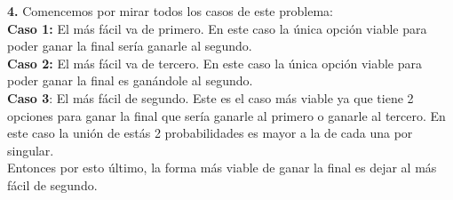 \documentclass[a4paper,12pt]{article}
\begin{document}
	\newpage		%

	\textbf{4.}	Comencemos por mirar todos los casos de este problema:\\

	\textbf{Caso 1:} El más fácil va de primero.
	En este caso la única opción viable para poder ganar la final sería ganarle al segundo.\\

	\textbf{Caso 2:} El más fácil va de tercero.
	En este caso la única opción viable para poder ganar la final es ganándole al segundo.\\

	\textbf{Caso 3}: El más fácil de segundo.
	Este es el caso más viable ya que tiene 2 opciones para ganar la final que sería ganarle al primero o ganarle al tercero. En este caso la unión de estás 2 probabilidades es mayor a la de cada una por singular.\\

	Entonces por esto último, la forma más viable de ganar la final es dejar al más fácil de segundo.
\end{document}
